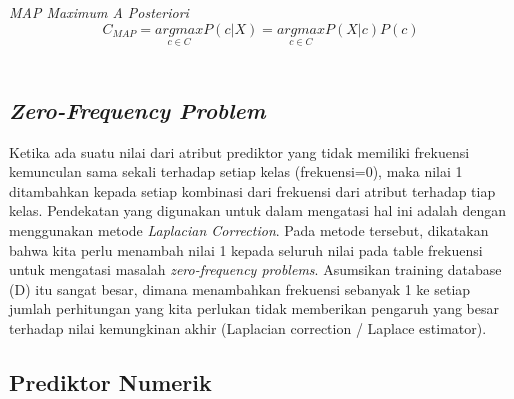 \textit{MAP Maximum A Posteriori}
		\begin{equation}
			C_{MAP} = \underset{c \in C}{ argmax } P(c|X) = \underset{c \in C}{ argmax } P(X|c) P(c)
		\end{equation} \\


\subsection{\textit{Zero-Frequency Problem} \cite{PeughMissing:2004}}
\label{subsec:Zero-Frequency Problem}

Ketika ada suatu nilai dari atribut prediktor yang tidak memiliki frekuensi kemunculan sama sekali terhadap setiap kelas (frekuensi=0), maka nilai 1 ditambahkan kepada setiap kombinasi dari frekuensi dari atribut terhadap tiap kelas. Pendekatan yang digunakan untuk dalam mengatasi hal ini adalah dengan menggunakan metode \textit{Laplacian Correction}. Pada metode tersebut, dikatakan bahwa kita perlu menambah nilai 1 kepada seluruh nilai pada table frekuensi untuk mengatasi masalah \textit{zero-frequency problems}. Asumsikan training database (D) itu sangat besar, dimana menambahkan frekuensi sebanyak 1 ke setiap jumlah perhitungan yang kita perlukan tidak memberikan pengaruh yang besar terhadap nilai kemungkinan akhir (Laplacian correction / Laplace estimator).

\subsection{Prediktor Numerik \cite{garg2013design}}

